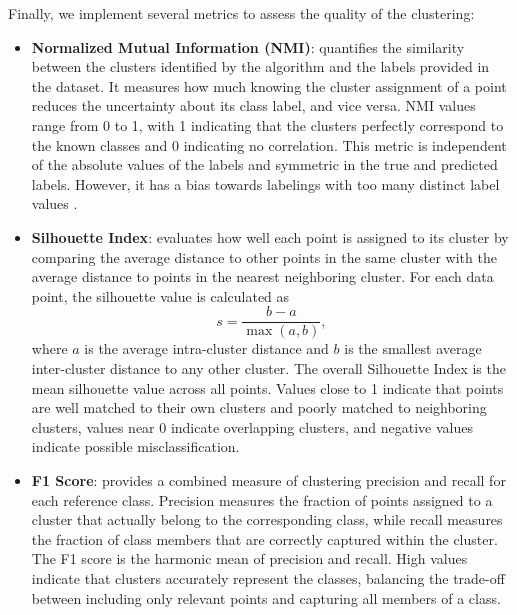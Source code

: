 \documentclass[prl,twocolumn]{revtex4-1}
\begin{document}
\noindent Finally, we implement several metrics to assess the quality of the clustering:
\begin{itemize}
    \item \textbf{Normalized Mutual Information (NMI)}:
    quantifies the similarity between the clusters identified by the algorithm and the labels provided in the dataset.
    It measures how much knowing the cluster assignment of a point reduces the uncertainty about its class label, and vice versa.
    NMI values range from 0 to 1, with 1 indicating that the clusters perfectly correspond to the known classes and 0 indicating no correlation.
    This metric is independent of the absolute values of the labels and symmetric in the true and predicted labels.
    However, it has a bias towards labelings with too many distinct label values \cite{}.
    
    \item \textbf{Silhouette Index}:
    evaluates how well each point is assigned to its cluster by comparing the average distance to other points in the same cluster with the average distance to points in the nearest neighboring cluster.
    For each data point, the silhouette value is calculated as 
    \begin{equation}
        s = \frac{b - a}{\max(a, b)},
    \end{equation}
    where $a$ is the average intra-cluster distance and $b$ is the smallest average inter-cluster distance to any other cluster.
    The overall Silhouette Index is the mean silhouette value across all points.
	Values close to 1 indicate that points are well matched to their own clusters and poorly matched to neighboring clusters, values near 0 indicate overlapping clusters, and negative values indicate possible misclassification.
    
    \item \textbf{F1 Score}:
    provides a combined measure of clustering precision and recall for each reference class.
    Precision measures the fraction of points assigned to a cluster that actually belong to the corresponding class, while recall measures the fraction of class members that are correctly captured within the cluster.
    The F1 score is the harmonic mean of precision and recall.
    High values indicate that clusters accurately represent the classes, balancing the trade-off between including only relevant points and capturing all members of a class.
    
\end{itemize}
\end{document}
